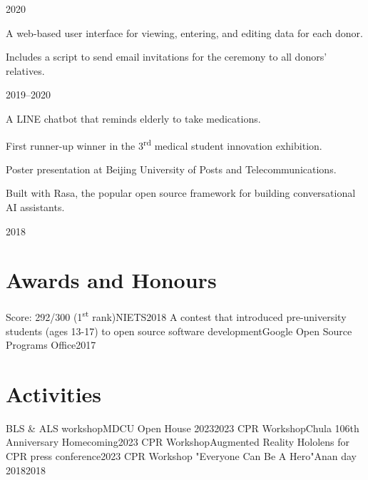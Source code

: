 \documentclass{cv}
\begin{document}
\begin{cv_table}
{  }{}{2020}
  {\begin{cv_itemize}
      \item A web-based user interface for viewing, entering, and editing data for each donor.
      \item Includes a script to send email invitations for the ceremony to all donors' relatives.
    \end{cv_itemize}
  }{}{2019--2020}
  {\begin{cv_itemize}
      \item A LINE chatbot that reminds elderly to take medications.
      \item First runner-up winner in the 3\textsuperscript{rd} medical student innovation exhibition.
      \item Poster presentation at Beijing University of Posts and Telecommunications.
      \item Built with Rasa, the popular open source framework for building conversational AI assistants.
    \end{cv_itemize}
  }{}{2018}
\end{cv_table}

\section{Awards and Honours}
\begin{cv_table}
  {Score: 292/300 (1\textsuperscript{st} rank)}{NIETS}{2018}
  {A contest that introduced pre-university students (ages 13-17) to open source software development}{Google Open Source Programs Office}{2017}
\end{cv_table}

\section{Activities}
\begin{cv_table}
  {BLS \& ALS workshop}{MDCU Open House 2023}{2023}
  {CPR Workshop}{Chula 106th Anniversary Homecoming}{2023}
  {CPR Workshop}{Augmented Reality Hololens for CPR press conference}{2023}
  {CPR Workshop "Everyone Can Be A Hero"}{Anan day 2018}{2018}
\end{cv_table}
\end{document}
